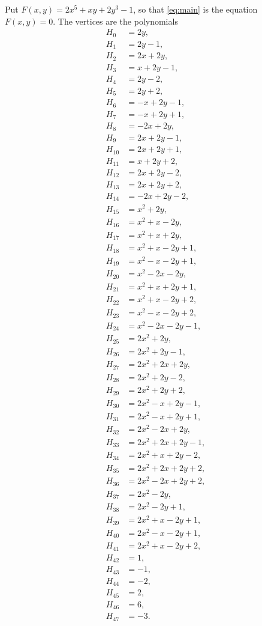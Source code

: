 \documentclass[11pt]{article}
\begin{document}
Put $F(x,y)=2x^{5}+xy+2y^{3}-1$, so that \eqref{eq:main} is the equation $F(x,y)=0$. The vertices are the polynomials
\begin{align*}
H_{0}&=2y,\\
H_{1}&=2y-1,\\
H_{2}&=2x+2y,\\
H_{3}&=x+2y-1,\\
H_{4}&=2y-2,\\
H_{5}&=2y+2,\\
H_{6}&=-x+2y-1,\\
H_{7}&=-x+2y+1,\\
H_{8}&=-2x+2y,\\
H_{9}&=2x+2y-1,\\
H_{10}&=2x+2y+1,\\
H_{11}&=x+2y+2,\\
H_{12}&=2x+2y-2,\\
H_{13}&=2x+2y+2,\\
H_{14}&=-2x+2y-2,\\
H_{15}&=x^{2}+2y,\\
H_{16}&=x^{2}+x-2y,\\
H_{17}&=x^{2}+x+2y,\\
H_{18}&=x^{2}+x-2y+1,\\
H_{19}&=x^{2}-x-2y+1,\\
H_{20}&=x^{2}-2x-2y,\\
H_{21}&=x^{2}+x+2y+1,\\
H_{22}&=x^{2}+x-2y+2,\\
H_{23}&=x^{2}-x-2y+2,\\
H_{24}&=x^{2}-2x-2y-1,\\
H_{25}&=2x^{2}+2y,\\
H_{26}&=2x^{2}+2y-1,\\
H_{27}&=2x^{2}+2x+2y,\\
H_{28}&=2x^{2}+2y-2,\\
H_{29}&=2x^{2}+2y+2,\\
H_{30}&=2x^{2}-x+2y-1,\\
H_{31}&=2x^{2}-x+2y+1,\\
H_{32}&=2x^{2}-2x+2y,\\
H_{33}&=2x^{2}+2x+2y-1,\\
H_{34}&=2x^{2}+x+2y-2,\\
H_{35}&=2x^{2}+2x+2y+2,\\
H_{36}&=2x^{2}-2x+2y+2,\\
H_{37}&=2x^{2}-2y,\\
H_{38}&=2x^{2}-2y+1,\\
H_{39}&=2x^{2}+x-2y+1,\\
H_{40}&=2x^{2}-x-2y+1,\\
H_{41}&=2x^{2}+x-2y+2,\\
H_{42}&=1,\\
H_{43}&=-1,\\
H_{44}&=-2,\\
H_{45}&=2,\\
H_{46}&=6,\\
H_{47}&=-3.
\end{align*}
\end{document}
